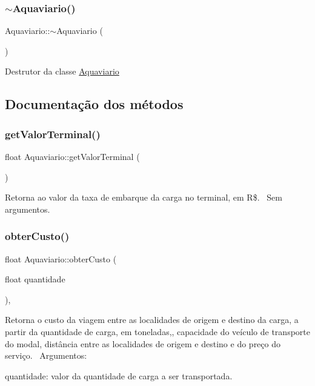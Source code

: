 \subsubsection{\texorpdfstring{$\sim$\+Aquaviario()}{~Aquaviario()}}
{\footnotesize\ttfamily Aquaviario\+::$\sim$\+Aquaviario (\begin{DoxyParamCaption}{ }\end{DoxyParamCaption})}

Destrutor da classe \hyperlink{classAquaviario}{Aquaviario}

\subsection{Documentação dos métodos}
\mbox{\label{classAquaviario_a74219219dcaf439a23c53a4c5eb1f151}} 
\subsubsection{\texorpdfstring{get\+Valor\+Terminal()}{getValorTerminal()}}
{\footnotesize\ttfamily float Aquaviario\+::get\+Valor\+Terminal (\begin{DoxyParamCaption}{ }\end{DoxyParamCaption})}

Retorna ao valor da taxa de embarque da carga no terminal, em R\$.~\newline
Sem argumentos.\mbox{\label{classAquaviario_a14803bda14b188a33a8f726d90171746}} 
\subsubsection{\texorpdfstring{obter\+Custo()}{obterCusto()}}
{\footnotesize\ttfamily float Aquaviario\+::obter\+Custo (\begin{DoxyParamCaption}\item[{float}]{quantidade }\end{DoxyParamCaption})\hspace{0.3cm}{\ttfamily [override]}, {\ttfamily [virtual]}}

Retorna o custo da viagem entre as localidades de origem e destino da carga, a partir da quantidade de carga, em toneladas,, capacidade do veículo de transporte do modal, distância entre as localidades de origem e destino e do preço do serviço.~\newline
Argumentos\+:
\begin{DoxyItemize}
\item quantidade\+: valor da quantidade de carga a ser transportada.
\end{DoxyItemize}

